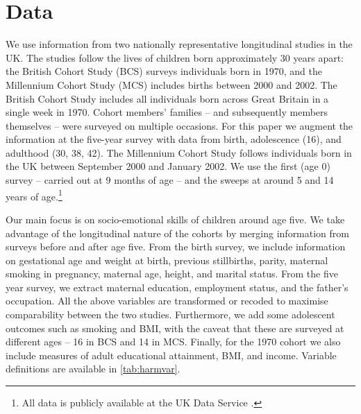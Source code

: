 
\section{Data \label{sec:data}}

We use information from two nationally representative longitudinal studies in the UK. The studies follow the lives of children born approximately 30 years apart: the British Cohort Study (BCS) surveys individuals born in 1970, and the Millennium Cohort Study (MCS) includes births between 2000 and 2002. The British Cohort Study includes all individuals born across Great Britain in a single week in 1970. Cohort members' families -- and subsequently members themselves -- were surveyed on multiple occasions. For this paper we augment the information at the five-year survey with data from birth, adolescence (16), and adulthood (30, 38, 42). The Millennium Cohort Study follows individuals born in the UK between September 2000 and January 2002. We use the first (age 0) survey -- carried out at 9 months of age -- and the sweeps at around 5 and 14 years of age.\footnote{All data is publicly available at the UK Data Service \citep{Chamberlain2013,Butler2016a,Butler2016b,Butler2017,UniversityOfLondon.InstituteOfEducation.CentreForLongitudinalStudies2016b,UniversityOfLondon.InstituteOfEducation.CentreForLongitudinalStudies2016,UniversityOfLondon.InstituteOfEducation.CentreForLongitudinalStudies2016a,UniversityOfLondon.InstituteOfEducation.CentreForLongitudinalStudies2017b,UniversityOfLondon.InstituteOfEducation.CentreForLongitudinalStudies2017,UniversityOfLondon.InstituteOfEducation.CentreForLongitudinalStudies2017c}.}

Our main focus is on socio-emotional skills of children around age five. We take advantage of the longitudinal nature of the cohorts by merging information from surveys before and after age five. From the birth survey, we include information on gestational age and weight at birth, previous stillbirths, parity, maternal smoking in pregnancy, maternal age, height, and marital status. From the five year survey, we extract maternal education, employment status, and the father's occupation. All the above variables are transformed or recoded to maximise comparability between the two studies. Furthermore, we add some adolescent outcomes such as smoking and BMI, with the caveat that these are surveyed at different ages -- 16 in BCS and 14 in MCS. Finally, for the 1970 cohort we also include measures of adult educational attainment, BMI, and income. Variable definitions are available in \autoref{tab:harmvar}.

